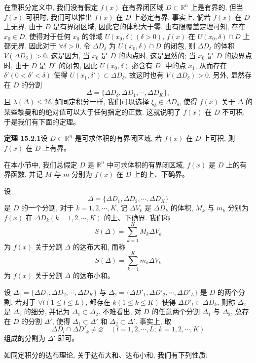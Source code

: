 \documentclass[UTF8, 12pt, fontset=fandol, oneside]{ctexart}
\begin{document}
在重积分定义中, 我们没有假定 $f(x)$ 在有界闭区域 $D\subset\mathbb R^n$ 上是有界的, 但当 $f(x)$ 可积时, 我们可以推出 $f(x)$ 在 $D$ 上必定有界. 事实上, 倘若 $f(x)$ 在 $D$ 上无界, 由于 $D$ 是有界闭区域, 因此它的体积大于零. 由有限覆盖定理可知, 存在 $x_0\in D$, 使得对于任何 $x_0$ 的邻域 $U(x_0,\delta)(\delta>0)$, $f(x)$ 在 $U(x_0,\delta)\cap D$ 上都无界. 因此对于 $\forall\delta>0$, 令 $\Delta D_\delta$ 为 $U(x_0,\delta)\cap D$ 的闭包, 则 $\Delta D_\delta$ 的体积 $V(\Delta D_\delta)>0$. 这是因为, 当 $x_0$ 是 $D$ 的内点时, 这是显然的; 当 $x_0$ 是 $D$ 的边界点时, 由于 $D$ 是 $D^\circ$ 的闭包, 因此 $U(x_0,\delta)$ 必含有 $D^\circ$ 中的点 $x_1$, 从而存在 $\delta'(0<\delta'<\delta)$ 使得 $U(x_1,\delta')\subset\Delta D_\delta$, 故这时也有 $V(\Delta D_\delta)>0$. 另外, 显然存在 $D$ 的分割
\[
  \Delta=\{\Delta D_\delta,\Delta D_1,\cdots,\Delta D_K\},
\]
且 $\lambda(\Delta)\leqslant2\delta$. 如同定积分一样, 我们可以选择 $\xi_\delta\in\Delta D_\delta$, 使得 $f(x)$ 关于 $\Delta$ 的某些黎曼和的绝对值可以大于任何指定的正数. 这就说明了 $f(x)$ 在 $D$ 不可积. 于是我们有下面的定理。

\noindent\textbf{定理 15.2.1}\quad 设 $D\subset\mathbb R^n$ 是可求体积的有界闭区域, 若 $f(x)$ 在 $D$ 上可积, 则 $f(x)$ 在 $D$ 上有界。

在本小节中, 我们总假定 $D$ 是 $\mathbb R^n$ 中可求体积的有界闭区域, $f(x)$ 是 $D$ 上的有界函数, 并记 $M$ 与 $m$ 分别为 $f(x)$ 在 $D$ 上的上、下确界。

设
\[
  \Delta=\{\Delta D_1,\Delta D_2,\cdots,\Delta D_K\}
\]
是 $D$ 的一个分割, 对于 $k=1,2,\cdots,K$, 记 $\Delta V_k$ 是 $\Delta D_k$ 的体积, $M_k$ 与 $m_k$ 分别为 $f(x)$ 在 $\Delta D_k(k=1,2,\cdots,K)$ 的上、下确界. 我们称
\[
  \overline S(\Delta)=\sum_{k=1}^K M_k\Delta V_k
\]
为 $f(x)$ 关于分割 $\Delta$ 的达布大和, 而称
\[
  \underline S(\Delta)=\sum_{k=1}^K m_k\Delta V_k
\]
为 $f(x)$ 关于分割 $\Delta$ 的达布小和。

设 $\Delta_1=\{\Delta D_1,\Delta D_2,\cdots,\Delta D_K\}$ 与 $\Delta_2=\{\Delta D'_1,\Delta D'_2,\cdots,\Delta D'_L\}$ 是 $D$ 的两个分割, 若对于 $\forall l(1\leqslant l\leqslant L)$, 都存在 $k(1\leqslant k\leqslant K)$ 使得 $\Delta D'_l\subset\Delta D_k$, 则称 $\Delta_2$ 是 $\Delta_1$ 的细分, 并记为 $\Delta_1\subset\Delta_2$. 不难看出, 对 $D$ 的任意两个分割 $\Delta_1$ 与 $\Delta_2$, 总存在 $D$ 的分割 $\Delta'$, 使得 $\Delta_1\subset\Delta'$ 和 $\Delta_2\subset\Delta'$. 事实上, 取
\[
  \Delta D_l\cap\Delta D'_k\ne\varnothing\quad (l=1,2,\cdots,L;\ k=1,2,\cdots,K)
\]
组成的分割为 $\Delta'$ 即可。

如同定积分的达布理论, 关于达布大和、达布小和, 我们有下列性质:
\end{document}
